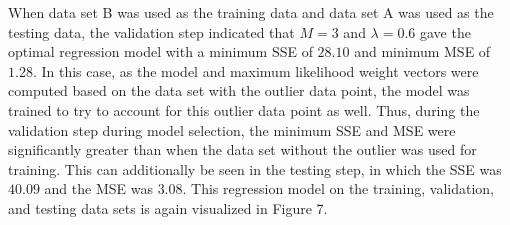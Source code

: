 \documentclass{article}
\begin{document}
When data set B was used as the training data and data set A was used as the testing data, the validation step indicated that $M = 3$ and $\lambda=0.6$ gave the optimal regression model with a minimum SSE of $28.10$ and minimum MSE of $1.28$. In this case, as the model and maximum likelihood weight vectors were computed based on the data set with the outlier data point, the model was trained to try to account for this outlier data point as well. Thus, during the validation step during model selection, the minimum SSE and MSE were significantly greater than when the data set without the outlier was used for training. This can additionally be seen in the testing step, in which the SSE was $40.09$ and the MSE was $3.08$. This regression model on the training, validation, and testing data sets is again visualized in Figure 7. \\ \\
\end{document}
